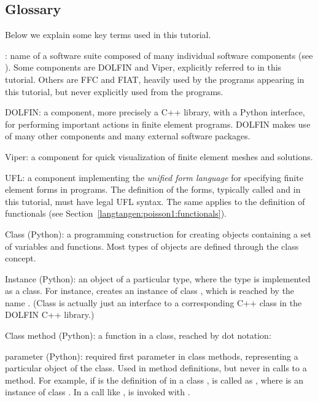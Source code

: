 \subsection{Glossary}

Below we explain some key terms used in this tutorial.\gln

\fenics: name of a software suite composed of many individual software
components (see ). Some components are DOLFIN and
Viper, explicitly referred to in this tutorial. Others are
FFC and FIAT, heavily used by the programs appearing in this tutorial,
but never explicitly used from the programs.\gln

DOLFIN: a \fenics{} component, more precisely a C++ library, with
a Python interface, for performing important actions in finite element
programs. DOLFIN makes use of many other \fenics{} components and
many external software packages.\gln

Viper: a \fenics{} component for quick visualization of finite element
meshes and solutions.\gln

UFL: a \fenics{} component implementing the \emph{unified form language}
for specifying finite element forms in \fenics{} programs.
The definition of the forms, typically called  and  in
this tutorial, must have legal UFL syntax. The same applies to
the definition of functionals (see Section~\ref{langtangen:poisson1:functionals}).
\gln

Class (Python): a programming construction for creating objects
containing a set of
variables and functions. Most
types of \fenics{} objects are defined through the class concept.\gln

Instance (Python): an object of a particular type, where the type is
implemented as a class. For instance,
 creates
an instance of class , which is reached by the
name . (Class  is actually just
an interface to a corresponding C++ class in the DOLFIN C++ library.)\gln

Class method (Python): a function in a class, reached by dot notation: \gln

 parameter (Python): required first parameter in class methods,
representing a particular object of the class.
Used in method definitions, but never in calls to a method.
For example, if  is the definition of
 in a class ,  is called as
, where  is an instance of class .
In a call like ,  is invoked with
.\gln

